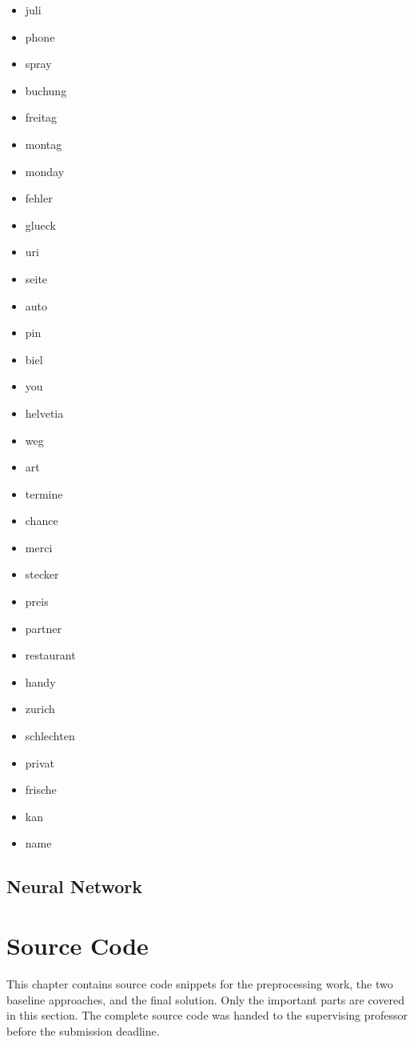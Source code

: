 \begin{multicols}{4}
\begin{itemize}
        \item juli
        \item phone
        \item spray
        \item buchung
        \item freitag
        \item montag
        \item monday
        \item fehler
        \item glueck
        \item uri
        \item seite
        \item auto
        \item pin
        \item biel
        \item you
        \item helvetia
        \item weg
        \item art
        \item termine
        \item chance
        \item merci
        \item stecker
        \item preis
        \item partner
        \item restaurant
        \item handy
        \item zurich
        \item schlechten
        \item privat
        \item frische
        \item kan
        \item name
    \end{itemize}
\end{multicols}

\section{Neural Network}

\chapter{Source Code}

This chapter contains source code snippets for the preprocessing work, the two baseline approaches, and the final solution.
Only the important parts are covered in this section. The complete source code was handed to the supervising professor
before the submission deadline.

